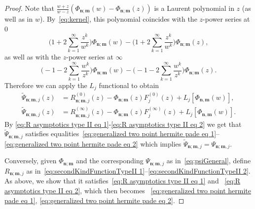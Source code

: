 \documentclass[reqno,centertags,11pt,draft]{amsart}
\begin{document}
\begin{proof}
    Note that $\frac{w+z}{w-z}(\Phi_{\bm{n};\bm{m}}(w) - \Phi_{\bm{n};\bm{m}}(z))$ is a Laurent polynomial in $z$ (as well as in $w$). By~\eqref{eq:kernel},
    this polynomial coincides with the $z$-power series at $0$
    \begin{equation}
        \Big(1+ 2\sum_{k=1}^\infty \frac{z^k}{w^k} \Big) \Phi_{\bm{n};\bm{m}}(w) -  \Big(1+ 2\sum_{k=1}^\infty \frac{z^k}{w^k} \Big)  \Phi_{\bm{n};\bm{m}}(z),
    \end{equation}
    as well as with the $z$-power series at $\infty$
    \begin{equation}
       \Big(-1- 2\sum_{k=1}^\infty \frac{w^k}{z^k} \Big) \Phi_{\bm{n};\bm{m}}(w) - \Big(-1- 2\sum_{k=1}^\infty \frac{w^k}{z^k} \Big)  \Phi_{\bm{n};\bm{m}}(z). 
    \end{equation}
    Therefore we can apply the $L_j$ functional to obtain
    \begin{align}\label{eq:psiVsRGeneral}
        \widetilde{\Psi}_{\bm{n};\bm{m},j}(z) & = {R}^{(0)}_{\bm{n};\bm{m},j}(z)  -  \Phi_{\bm{n};\bm{m}}(z) F^{(0)}_j(z)  + L_j[\Phi_{\bm{n},\bm{m}}(w)], 
        \\
        \widetilde{\Psi}_{\bm{n};\bm{m},j}(z) & = {R}^{(\infty)}_{\bm{n};\bm{m},j}(z)  -  \Phi_{\bm{n};\bm{m}}(z) F^{(\infty)}_j(z) + L_j[\Phi_{\bm{n},\bm{m}}(w)].
    \end{align}
    By \eqref{eq:R asymptotics type II eq 1}-\eqref{eq:R asymptotics type II eq 2} we get that $\widetilde{\Psi}_{\bm{n};\bm{m},j}$ satisfies equalities~\eqref{eq:generalized two point hermite pade eq 1}--\eqref{eq:generalized two point hermite pade eq 2} which implies
    $\widetilde{\Psi}_{\bm{n};\bm{m},j} = \Psi_{\bm{n};\bm{m},j}$. 

    Conversely, given $\Phi_{\bm{n};\bm{m}}$ and the corresponding $\Psi_{\bm{n};\bm{m},j}$ as in~\eqref{eq:psiGeneral}, define $R_{\bm{n};\bm{m},j}$ as in~\eqref{eq:secondKindFunctionTypeII 1}--\eqref{eq:secondKindFunctionTypeII 2}. As above, we show that it satisfies~\eqref{eq:R asymptotics type II eq 1} and ~\eqref{eq:R asymptotics type II eq 2}, which then becomes ~\eqref{eq:generalized two point hermite pade eq 1}, \eqref{eq:generalized two point hermite pade eq 2}.
\end{proof}
\end{document}
